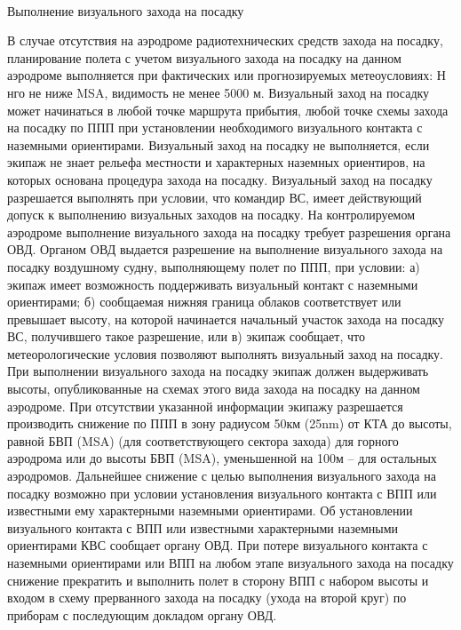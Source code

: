 \paragraph{} \label{sec:visual}	Выполнение визуального захода на посадку

В случае отсутствия на аэродроме радиотехнических средств захода на посадку, планирование полета с учетом визуального захода на посадку на данном аэродроме выполняется при фактических или прогнозируемых метеоусловиях: Н нго не ниже MSA, видимость не менее 5000 м.
Визуальный заход на посадку может начинаться в любой точке маршрута прибытия, любой точке схемы захода на посадку по ППП при установлении необходимого визуального контакта с наземными ориентирами.
Визуальный заход на посадку не выполняется, если экипаж не знает рельефа местности и характерных наземных ориентиров, на которых основана процедура захода на посадку.
Визуальный заход на посадку разрешается выполнять при условии, что командир ВС, имеет действующий допуск к выполнению визуальных заходов на посадку.
На контролируемом аэродроме выполнение визуального захода на посадку требует разрешения органа ОВД.
Органом ОВД выдается разрешение на выполнение визуального захода на посадку воздушному судну, выполняющему полет по ППП, при условии:
а)	экипаж имеет возможность поддерживать визуальный контакт с наземными ориентирами;
б)	сообщаемая нижняя граница облаков соответствует или превышает высоту, на которой начинается начальный участок захода на посадку ВС, получившего такое разрешение, или
в)	экипаж сообщает, что метеорологические условия позволяют выполнять визуальный заход на посадку.
При выполнении визуального захода на посадку экипаж должен выдерживать высоты, опубликованные на схемах этого вида захода на посадку на данном аэродроме. При отсутствии указанной информации экипажу разрешается производить снижение по ППП в зону радиусом 50км (25nm) от КТА до высоты, равной БВП (MSA) (для соответствующего сектора захода) для горного аэродрома или до высоты БВП (MSA), уменьшенной на 100м – для остальных аэродромов. Дальнейшее снижение с целью выполнения визуального захода на посадку возможно при условии установления визуального контакта с ВПП или известными ему характерными наземными ориентирами.
Об установлении визуального контакта с ВПП или известными характерными наземными ориентирами КВС сообщает органу ОВД.
При потере визуального контакта с наземными ориентирами или ВПП на любом этапе визуального захода на посадку снижение прекратить и выполнить полет в сторону ВПП с набором высоты и входом в схему прерванного захода на посадку (ухода на второй круг) по приборам с последующим докладом органу ОВД.


